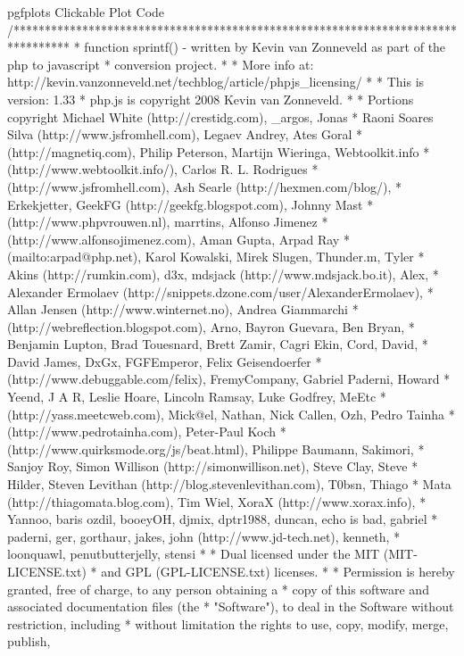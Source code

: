 \begin{insDLJS}[processAnnotatedPlot]{\jobname}{pgfplots Clickable Plot Code}
/*********************************************************************************
 * function sprintf() - written by Kevin van Zonneveld as part of the php to javascript 
 * conversion project.
 * 
 * More info at: http://kevin.vanzonneveld.net/techblog/article/phpjs_licensing/
 * 
 * This is version: 1.33
 * php.js is copyright 2008 Kevin van Zonneveld.
 * 
 * Portions copyright Michael White (http://crestidg.com), _argos, Jonas
 * Raoni Soares Silva (http://www.jsfromhell.com), Legaev Andrey, Ates Goral
 * (http://magnetiq.com), Philip Peterson, Martijn Wieringa, Webtoolkit.info
 * (http://www.webtoolkit.info/), Carlos R. L. Rodrigues
 * (http://www.jsfromhell.com), Ash Searle (http://hexmen.com/blog/),
 * Erkekjetter, GeekFG (http://geekfg.blogspot.com), Johnny Mast
 * (http://www.phpvrouwen.nl), marrtins, Alfonso Jimenez
 * (http://www.alfonsojimenez.com), Aman Gupta, Arpad Ray
 * (mailto:arpad@php.net), Karol Kowalski, Mirek Slugen, Thunder.m, Tyler
 * Akins (http://rumkin.com), d3x, mdsjack (http://www.mdsjack.bo.it), Alex,
 * Alexander Ermolaev (http://snippets.dzone.com/user/AlexanderErmolaev),
 * Allan Jensen (http://www.winternet.no), Andrea Giammarchi
 * (http://webreflection.blogspot.com), Arno, Bayron Guevara, Ben Bryan,
 * Benjamin Lupton, Brad Touesnard, Brett Zamir, Cagri Ekin, Cord, David,
 * David James, DxGx, FGFEmperor, Felix Geisendoerfer
 * (http://www.debuggable.com/felix), FremyCompany, Gabriel Paderni, Howard
 * Yeend, J A R, Leslie Hoare, Lincoln Ramsay, Luke Godfrey, MeEtc
 * (http://yass.meetcweb.com), Mick@el, Nathan, Nick Callen, Ozh, Pedro Tainha
 * (http://www.pedrotainha.com), Peter-Paul Koch
 * (http://www.quirksmode.org/js/beat.html), Philippe Baumann, Sakimori,
 * Sanjoy Roy, Simon Willison (http://simonwillison.net), Steve Clay, Steve
 * Hilder, Steven Levithan (http://blog.stevenlevithan.com), T0bsn, Thiago
 * Mata (http://thiagomata.blog.com), Tim Wiel, XoraX (http://www.xorax.info),
 * Yannoo, baris ozdil, booeyOH, djmix, dptr1988, duncan, echo is bad, gabriel
 * paderni, ger, gorthaur, jakes, john (http://www.jd-tech.net), kenneth,
 * loonquawl, penutbutterjelly, stensi
 * 
 * Dual licensed under the MIT (MIT-LICENSE.txt)
 * and GPL (GPL-LICENSE.txt) licenses.
 * 
 * Permission is hereby granted, free of charge, to any person obtaining a
 * copy of this software and associated documentation files (the
 * "Software"), to deal in the Software without restriction, including
 * without limitation the rights to use, copy, modify, merge, publish,

\end{insDLJS}
